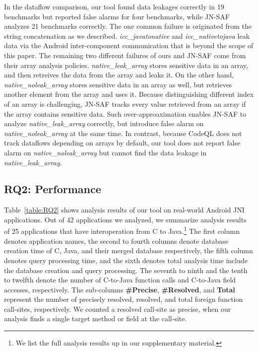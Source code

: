 In the dataflow comparison, our tool found data leakages correctly in 19
benchmarks but reported false alarms for four benchmarks, while JN-SAF analyzes
21 benchmarks correctly. The one common failure is originated from the string
concatenation as we described. {\it icc\_javatonative} and {\it
icc\_nativetojava} leak data via the Android inter-component communication that
is beyond the scope of this paper. The remaining two different failures of ours
and JN-SAF come from their array analysis policies. {\it native\_leak\_array}
stores sensitive data in an array, and then retreives the data from the array
and leaks it. On the other hand, {\it native\_noleak\_array} stores sensitive
data in an array as well, but retrieves another element from the array and uses
it. Because distinguishing different index of an array is challenging, JN-SAF
tracks every value retrieved from an array if the array contains sensitive
data. Such over-approaximation enables JN-SAF to analyze {\it
native\_leak\_array} correctly, but introduce false alarm on {\it
native\_noleak\_array} at the same time. In contrast, because CodeQL does not
track dataflows depending on arrays by default, our tool does not report false
alarm on {\it native\_noleak\_array} but cannot find the data leakage in {\it
native\_leak\_array}.


\subsection{RQ2: Performance}
Table~\ref{table:RQ2} shows analysis results of our tool on real-world Android
JNI applications. Out of 42 applications we analyzed, we summarize analysis
results of 25 applications that have interoperation from C to Java.\footnote{We
list the full analysis results up in our supplementary material.} The first
column denotes application names, the second to fourth columns denote database
creation time of C, Java, and their merged database respectively, the fifth
column denotes query processing time, and the sixth denotes total analysis time
include the database creation and query processing. The seventh to ninth and
the tenth to twelfth denote the number of C-to-Java function calls and
C-to-Java field accesses, respectively. The sub-columns {\bf \#Precise}, {\bf
\#Resolved}, and {\bf Total} represent the number of precisely resolved,
resolved, and total foreign function call-sites, respectively. We counted a
resolved call-site as precise, when our analysis finds a single target method
or field at the call-site.

